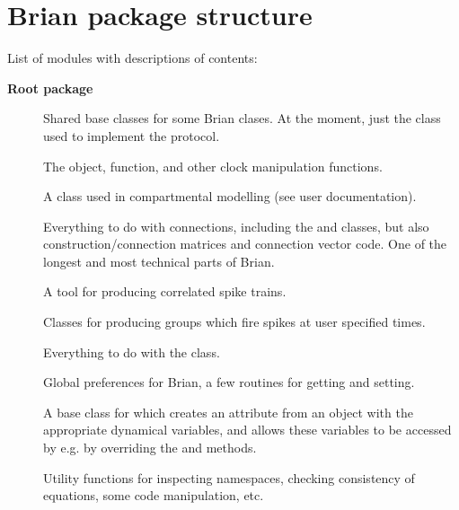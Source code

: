 \documentclass[letterpaper,10pt,english]{manual}
\begin{document}
\section{Brian package structure}

List of modules with descriptions of contents:

\textbf{Root package}
\begin{description}
\item[]
Shared base classes for some Brian clases. At the moment, just the
 class used to implement the 
protocol.

\item[]
The  object,  function, and other clock
manipulation functions.

\item[]
A class used in compartmental modelling (see user documentation).

\item[]
Everything to do with connections, including the  and
 classes, but also construction/connection matrices
and connection vector code. One of the longest and most technical parts of
Brian.

\item[]
A tool for producing correlated spike trains.

\item[]
Classes for producing groups which fire spikes at user specified times.

\item[]
Everything to do with the  class.

\item[]
Global preferences for Brian, a few routines for getting and setting.

\item[]
A base class for  which creates an  attribute from
an  object with the appropriate dynamical variables, and
allows these variables to be accessed by e.g.  by overriding the
 and  methods.

\item[]
Utility functions for inspecting namespaces, checking consistency of
equations, some code manipulation, etc.


\end{description}
\end{document}
